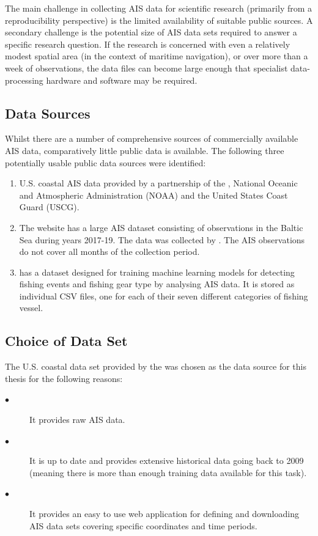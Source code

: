 \documentclass{mldsmsc}
\begin{document}
The main challenge in collecting AIS data for scientific research (primarily from a reproducibility perspective) is the limited availability of suitable public sources. A secondary challenge is the potential size of AIS data sets required to answer a specific research question. If the research is concerned with even a relatively modest spatial area (in the context of maritime navigation), or over more than a week of observations, the data files can become large enough that specialist data-processing hardware and software may be required.

\subsection{Data Sources}
Whilst there are a number of comprehensive sources of commercially available AIS data, comparatively little public data is available. The following three potentially usable public data sources were identified:  

\begin{enumerate}
	\item U.S. coastal AIS data provided by a partnership of the \cite{BOEM}, National Oceanic and Atmospheric Administration (NOAA) and the United States Coast Guard (USCG).
	
	\item The \cite{IEEE_dataport} website has a large AIS dataset consisting of observations in the Baltic Sea during years 2017-19. The data was collected by  \cite{j3b5-es69-20}. The AIS observations do not cover all months of the collection period.
	
	\item \cite{global_fishing} has a dataset designed for training machine learning models for detecting fishing events and fishing gear type by analysing AIS data.  It is stored as individual CSV files, one for each of their seven different categories of fishing vessel.
\end{enumerate}


\subsection{Choice of Data Set}
The U.S. coastal data set provided by the \cite{BOEM} was chosen as the data source for this thesis for the following reasons: 

\begin{description}
	\item [$\bullet$] It provides raw AIS data.
	\item [$\bullet$] It is up to date and provides extensive historical data going back to 2009 (meaning there is more than enough training data available for this task).
	\item [$\bullet$] It provides an easy to use web application \citep{AccessAIS} for defining and downloading AIS data sets covering specific coordinates and time periods.
\end{description}
\end{document}
